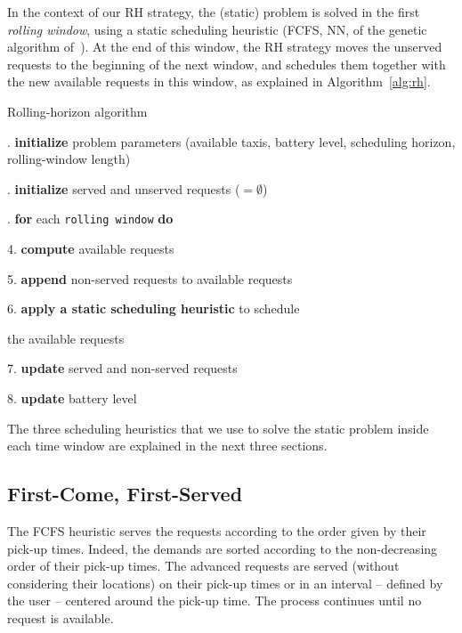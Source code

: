In the context of our \acs{RH} strategy, the (static) problem is solved in the first \textit{rolling window}, using a static scheduling heuristic (\acs{FCFS}, \acs{NN}, of the genetic algorithm of~\cite{panwadee2021}). At the end of this window, the \acs{RH} strategy moves the unserved requests to the beginning of the next window, and schedules them together with the new available requests in this window, as explained in Algorithm~\ref{alg:rh}.

\begin{algorithm}
	\caption{Rolling-horizon algorithm}\label{alg:rh}
	\begin{algorithmic}
		. \textbf{initialize} problem parameters (available taxis, battery level, scheduling horizon, rolling-window length)
		
		. \textbf{initialize} served and unserved requests ($=\emptyset$)
		
		. \textbf{for} each \texttt{rolling window} \textbf{do}
		
		\hspace{1cm} 4. \textbf{compute} available requests
		
		\hspace{1cm} 5. \textbf{append} non-served requests to available requests
		
		\hspace{1cm} 6. \textbf{apply a static scheduling heuristic} to schedule 
		
		\hspace{1cm} the available requests
		
		\hspace{1cm} 7. \textbf{update} served and non-served requests
		
		\hspace{1cm} 8. \textbf{update} battery level
		
	\end{algorithmic}
\end{algorithm}

The three scheduling heuristics that we use to solve the static problem inside each time window are explained in the next three sections.


\subsection{First-Come, First-Served}
\label{subsec:fcfs}

The \acs{FCFS} heuristic serves the requests according to the order given by their pick-up times. Indeed, the demands are sorted according to the non-decreasing order of their pick-up times. The advanced requests are served (without considering their locations) on their pick-up times or in an interval -- defined by the user -- centered around the pick-up time. The process continues until no request is available.


